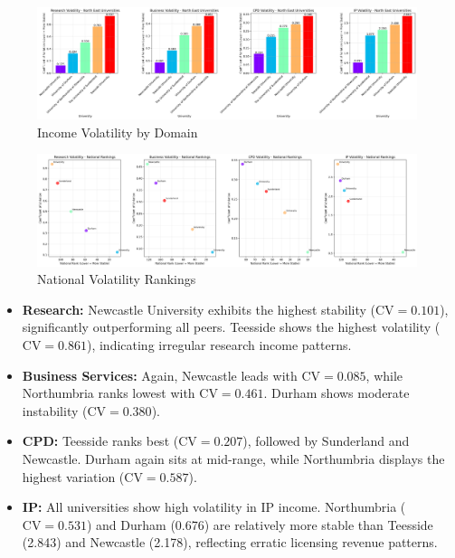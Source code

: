 \documentclass[journal,onecolumn, 10pt,draftclsnofoot]{IEEEtran}
\begin{document}
\begin{figure}[h]
\centering
\includegraphics[width=0.99\textwidth]{Fig/figure41.ne_volatility_comparison.png}
\caption{Income Volatility by Domain}
\label{fig:ne-volatility-comparison}
\end{figure}

\begin{figure}[h]
\centering
\includegraphics[width=0.99\textwidth]{Fig/figure42.national_volatility_rankings.png}
\caption{National Volatility Rankings}
\label{fig:national-volatility-rankings}
\end{figure}

\begin{itemize}
    \item \textbf{Research:} Newcastle University exhibits the highest stability ($\mathrm{CV}=0.101$), significantly outperforming all peers. Teesside shows the highest volatility ($\mathrm{CV}=0.861$), indicating irregular research income patterns.
    
    \item \textbf{Business Services:} Again, Newcastle leads with $\mathrm{CV}=0.085$, while Northumbria ranks lowest with $\mathrm{CV}=0.461$. Durham shows moderate instability ($\mathrm{CV}=0.380$).
    
    \item \textbf{CPD:} Teesside ranks best ($\mathrm{CV}=0.207$), followed by Sunderland and Newcastle. Durham again sits at mid-range, while Northumbria displays the highest variation ($\mathrm{CV}=0.587$).
    
    \item \textbf{IP:} All universities show high volatility in IP income. Northumbria ($\mathrm{CV}=0.531$) and Durham (0.676) are relatively more stable than Teesside (2.843) and Newcastle (2.178), reflecting erratic licensing revenue patterns.
\end{itemize}
\end{document}
